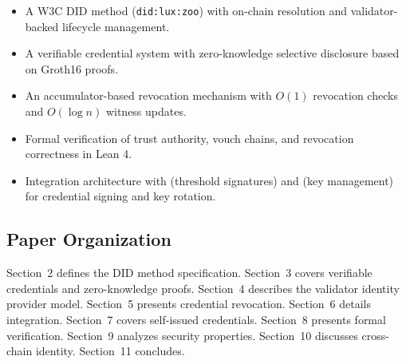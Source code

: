\begin{itemize}
\item A W3C DID method (\texttt{did:lux:zoo}) with on-chain resolution and validator-backed lifecycle management.
\item A verifiable credential system with zero-knowledge selective disclosure based on Groth16 proofs.
\item An accumulator-based revocation mechanism with $O(1)$ revocation checks and $O(\log n)$ witness updates.
\item Formal verification of trust authority, vouch chains, and revocation correctness in Lean 4.
\item Integration architecture with \TChain{} (threshold signatures) and \KChain{} (key management) for credential signing and key rotation.
\end{itemize}

\subsection{Paper Organization}

Section~2 defines the DID method specification. Section~3 covers verifiable credentials and zero-knowledge proofs. Section~4 describes the validator identity provider model. Section~5 presents credential revocation. Section~6 details \TChain{} integration. Section~7 covers self-issued credentials. Section~8 presents formal verification. Section~9 analyzes security properties. Section~10 discusses cross-chain identity. Section~11 concludes.

